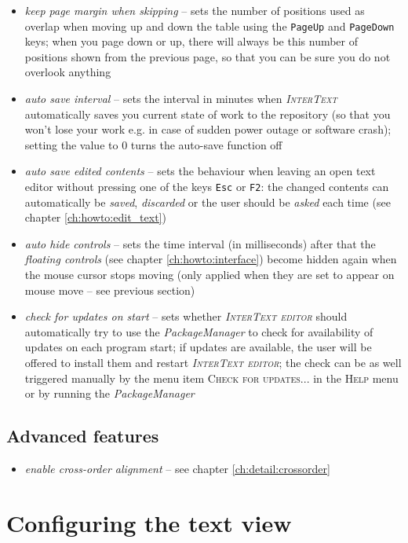 \documentclass[a4paper,10pt,oneside]{book}
\newcommand{\IT}{\textit{\textsc{InterText}}\xspace}
\newcommand{\ITeditor}{\textit{\textsc{InterText editor}}\xspace}
\newcommand{\keys}[1]{\texttt{#1}}
\newcommand{\menu}[1]{\textsc{#1}}
\begin{document}
\begin{itemize}
 \item \emph{keep page margin when skipping} -- sets the number of positions used as overlap when moving up and down the table using the \keys{PageUp} and \keys{PageDown} keys; when you page down or up, there will always be this number of positions shown from the previous page, so that you can be sure you do not overlook anything
 \item \emph{auto save interval} -- sets the interval in minutes when \IT automatically saves you current state of work to the repository (so that you won't lose your work e.g. in case of sudden power outage or software crash); setting the value to 0 turns the auto-save function off
 \item \emph{auto save edited contents} -- sets the behaviour when leaving an open text editor without pressing one of the keys \keys{Esc} or \keys{F2}: the changed contents can automatically be \emph{saved}, \emph{discarded} or the user should be \emph{asked} each time (see chapter \ref{ch:howto:edit_text})
 \item \emph{auto hide controls} -- sets the time interval (in milliseconds) after that the \emph{floating controls} (see chapter \ref{ch:howto:interface}) become hidden again when the mouse cursor stops moving (only applied when they are set to appear on mouse move -- see previous section)
 \item \emph{check for updates on start} -- sets whether \ITeditor should automatically try to use the \emph{PackageManager} to check for availability of updates on each program start; if updates are available, the user will be offered to install them and restart \ITeditor; the check can be as well triggered manually by the menu item \menu{Check for updates...} in the \menu{Help} menu or by running the \emph{PackageManager}
\end{itemize}

\subsection*{Advanced features}

\begin{itemize}
 \item \emph{enable cross-order alignment} -- see chapter \ref{ch:detail:crossorder}
\end{itemize}

\section{Configuring the text view}\label{ch:detail:config:editor}
\end{document}
